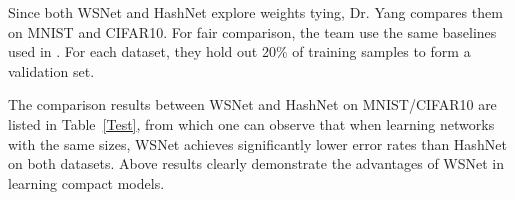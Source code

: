 \documentclass[10pt,twocolumn,letterpaper]{article}
\begin{document}
Since both WSNet and HashNet \cite{DBLP1} explore weights tying, Dr. Yang compares them on MNIST and CIFAR10. For fair comparison, the team use the same baselines used in \cite{Chen2016Compressing}. For each dataset, they hold out 20\% of training samples to form a validation set. 

The comparison results between WSNet and HashNet on MNIST/CIFAR10 are listed in Table~\ref{Test}, from which one can observe that when learning networks with the same sizes, WSNet achieves significantly lower error rates than HashNet on both datasets. Above results clearly demonstrate the advantages of WSNet in learning compact models.



{\small


}
\end{document}
